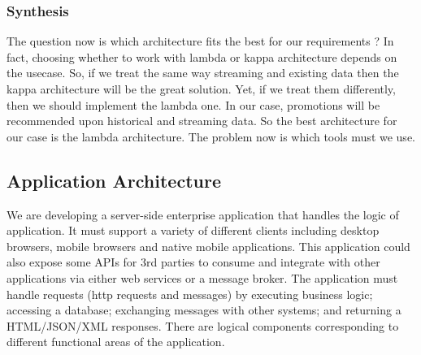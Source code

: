 \subsubsection{Synthesis}
\label{subsec:subsec01}
The question now is which architecture ﬁts the best for our requirements ? In fact, choosing whether to work with
 lambda or kappa architecture depends on the usecase. So, if we treat the same way streaming and existing data then 
 the kappa architecture will be the great solution. Yet, if we treat them differently, then we should implement the
  lambda one. In our case, promotions will be recommended upon historical and streaming data. So the best architecture
   for our case is the lambda architecture. The problem now is which tools must we use.


\subsection{Application Architecture}
\label{subsec:subsec01}
We are developing a server-side enterprise application that handles the logic of application.
 It must support a variety of different clients including desktop browsers, mobile browsers and native mobile 
 applications. This application could also expose some APIs for 3rd parties to consume and integrate with other
  applications via either web services or a message broker. The application must handle requests (http requests 
  and messages) by executing business logic; accessing a database; exchanging messages with other systems; and
   returning a HTML/JSON/XML responses. There are logical components corresponding to different functional areas
    of the application.
